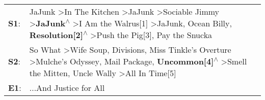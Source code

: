 \begin{supertabular}{p{0.03\textwidth}p{0.92\textwidth}}
 \textbf{S1}:  &  JaJunk\textsuperscript{} \textgreater \enspace In The Kitchen\textsuperscript{} \textgreater \enspace JaJunk\textsuperscript{} \textgreater \enspace Sociable Jimmy\textsuperscript{} \textgreater \enspace \textbf{JaJunk\textsuperscript{$\wedge$}} \textgreater \enspace I Am the Walrus[1]\textsuperscript{} \textgreater \enspace JaJunk\textsuperscript{}, \enspace Ocean Billy\textsuperscript{}, \enspace \textbf{Resolution[2]\textsuperscript{$\wedge$}} \textgreater \enspace Push the Pig[3]\textsuperscript{}, \enspace Pay the Snucka\textsuperscript{}  \enspace  \\
 \textbf{S2}:  &                                                                                So What\textsuperscript{} \textgreater \enspace Wife Soup\textsuperscript{}, \enspace Divisions\textsuperscript{}, \enspace Miss Tinkle's Overture\textsuperscript{} \textgreater \enspace Mulche's Odyssey\textsuperscript{}, \enspace Mail Package\textsuperscript{}, \enspace \textbf{Uncommon[4]\textsuperscript{$\wedge$}} \textgreater \enspace Smell the Mitten\textsuperscript{}, \enspace Uncle Wally\textsuperscript{} \textgreater \enspace All In Time[5]\textsuperscript{}  \enspace  \\
 \textbf{E1}:  &                                                                                                                                                                                                                                                                                                                                                                                                                                                                                                                               ...And Justice for All\textsuperscript{}  \enspace  \\
\end{supertabular}
